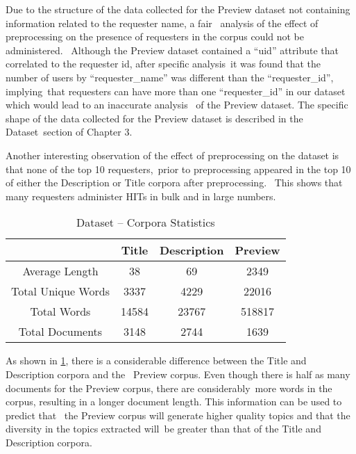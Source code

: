 \documentclass[letterpaper,12pt]{article}
\begin{document}

\newpage

Due to the structure of the data collected for the Preview dataset not containing information related to the requester name, a fair \
analysis of the effect of preprocessing on the presence of requesters in the corpus could not be administered. \
Although the Preview dataset contained a ``uid'' attribute that correlated to the requester id, after specific analysis\
it was found that the number of users by ``requester\_name'' was different than the ``requester\_id'', implying\
that requesters can have more than one ``requester\_id'' in our dataset which would lead to an inaccurate analysis \
of the Preview dataset. The specific shape of the data collected for the Preview dataset is described in the Dataset\
section of Chapter 3.

Another interesting observation of the effect of preprocessing on the dataset is that none of the top 10 requesters,\
prior to preprocessing appeared in the top 10 of either the Description or Title corpora after preprocessing. \
This shows that many requesters administer HITs in bulk and in large numbers.

\begin{table}
	\caption{\label{tab:corpora_comparison} Dataset -- Corpora Statistics}
	\begin{center}
		\begin{tabular}{|c|c|c|c|}
			\hline
			{} &  \textbf{Title} & \textbf{Description} & \textbf{Preview} \\
			\hline
			Average Length & 38 & 69 & 2349\\
			\hline
			Total Unique Words & 3337 & 4229 & 22016\\
			\hline
			Total Words & 14584 & 23767 & 518817\\
			\hline
			Total Documents & 3148 & 2744 & 1639 \\
			\hline
		\end{tabular}
	\end{center}
\end{table}

As shown in \ref{tab:corpora_comparison}, there is a considerable difference between the Title and Description corpora and the \
Preview corpus. Even though there is half as many documents for the Preview corpus, there are considerably\
more words in the corpus, resulting in a longer document length. This information can be used to predict that \
the Preview corpus will generate higher quality topics and that the diversity in the topics extracted will\
be greater than that of the Title and Description corpora.
\end{document}
